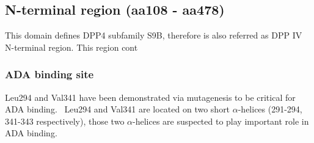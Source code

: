 \subsection{N-terminal region (aa108 - aa478)}

This domain defines DPP4 subfamily S9B, therefore is also referred as DPP IV N-terminal region. This region cont

\subsubsection{ADA binding site}
Leu294 and Val341 have been demonstrated via mutagenesis to be critical for ADA binding.~\cite{Abbott_1999} Leu294 and Val341 are located on two short $\alpha$-helices (291-294, 341-343 respectively), those two $\alpha$-helices are suspected to play important role in ADA binding. 